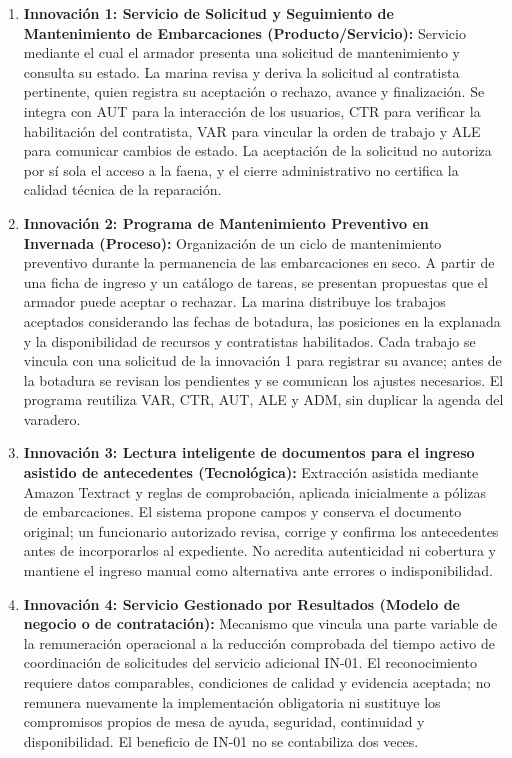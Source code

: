 \begin{enumerate}
    \item \textbf{Innovación 1: Servicio de Solicitud y Seguimiento
    de Mantenimiento de Embarcaciones (Producto/Servicio):}
    Servicio mediante el cual el armador presenta una solicitud
    de mantenimiento y consulta su estado. La marina revisa y deriva
    la solicitud al contratista pertinente, quien registra su aceptación
    o rechazo, avance y finalización. Se integra con AUT para la
    interacción de los usuarios, CTR para verificar la habilitación
    del contratista, VAR para vincular la orden de trabajo y ALE
    para comunicar cambios de estado. La aceptación de la solicitud
    no autoriza por sí sola el acceso a la faena, y el cierre
    administrativo no certifica la calidad técnica de la reparación.

    \item \textbf{Innovación 2: Programa de Mantenimiento Preventivo
    en Invernada (Proceso):}
    Organización de un ciclo de mantenimiento preventivo durante
    la permanencia de las embarcaciones en seco. A partir de una
    ficha de ingreso y un catálogo de tareas, se presentan propuestas
    que el armador puede aceptar o rechazar. La marina distribuye
    los trabajos aceptados considerando las fechas de botadura,
    las posiciones en la explanada y la disponibilidad de recursos
    y contratistas habilitados. Cada trabajo se vincula con una
    solicitud de la innovación 1 para registrar su avance; antes
    de la botadura se revisan los pendientes y se comunican los
    ajustes necesarios. El programa reutiliza VAR, CTR, AUT, ALE
    y ADM, sin duplicar la agenda del varadero.
    
    \item \textbf{Innovación 3: Lectura inteligente de documentos para el ingreso asistido de antecedentes (Tecnológica):} Extracción asistida mediante Amazon Textract y reglas de comprobación, aplicada inicialmente a pólizas de embarcaciones. El sistema propone campos y conserva el documento original; un funcionario autorizado revisa, corrige y confirma los antecedentes antes de incorporarlos al expediente. No acredita autenticidad ni cobertura y mantiene el ingreso manual como alternativa ante errores o indisponibilidad.

    \item \textbf{Innovación 4: Servicio Gestionado por Resultados (Modelo de negocio o de contratación):} Mecanismo que vincula una parte variable de la remuneración operacional a la reducción comprobada del tiempo activo de coordinación de solicitudes del servicio adicional IN-01. El reconocimiento requiere datos comparables, condiciones de calidad y evidencia aceptada; no remunera nuevamente la implementación obligatoria ni sustituye los compromisos propios de mesa de ayuda, seguridad, continuidad y disponibilidad. El beneficio de IN-01 no se contabiliza dos veces.


\end{enumerate}
